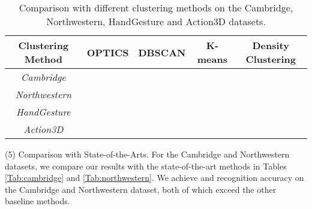 \documentclass[5p]{elsarticle}
\begin{document}
\begin{table*}[!htbp]
	\centering
	\caption{Comparison with different clustering methods on the Cambridge, Northwestern, HandGesture and Action3D datasets.}
\begin{tabular}{c|c|c|c|c} \hline
		Clustering Method     & OPTICS \cite{ankerst1999optics} & DBSCAN \cite{ester1996density} & K-means  & Density Clustering \cite{rodriguez2014clustering} \\ \hline
		\emph{Cambridge}      &  &  &  &     \\ \hline
		\emph{Northwestern} &  &  &  &      \\ \hline
		\emph{HandGesture}  &  &  &  &     \\ \hline
		\emph{Action3D}        &  & &  &     \\ \hline
	\end{tabular}
	\label{Tab:clustering}
\end{table*}


\noindent (5) Comparison with State-of-the-Arts.
For the Cambridge and Northwestern datasets, we compare our results with the state-of-the-art methods in Tables \ref{Tab:cambridge} and \ref{Tab:northwestern}.
We achieve  and  recognition accuracy on the Cambridge and Northwestern dataset, both of which exceed the other baseline methods.
\end{document}

